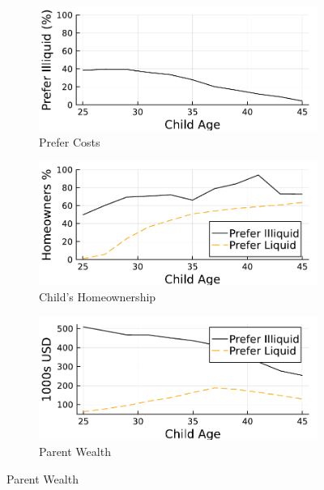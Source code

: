 \documentclass[12pt]{article}
\begin{document}
\begin{figure}[tb]
	\captionsetup[subfigure]{aboveskip=-1pt}
	\caption{Liquidity Preference over Age}\label{fig:prefliq}
	\begin{subfigure}{0.5\textwidth}%
		\caption{Prefer Costs}\label{fig:pref}%
		\includegraphics[width=\textwidth]{../tabfig/preferliq/prefer.pdf}%
	\end{subfigure}%
	\hfill
	\begin{subfigure}{0.5\textwidth}%
		\caption{Child's Homeownership}\label{fig:pref_own}%
		\includegraphics[width=\textwidth]{../tabfig/preferliq/prefer_owner.pdf}%
	\end{subfigure} 
	\begin{subfigure}{0.5\textwidth}%
		\caption{Parent Wealth}\label{fig:pref_wealthp}%
		\includegraphics[width=\textwidth]{../tabfig/preferliq/prefer_wealthp.pdf}%

\end{subfigure}
\end{figure}
\end{document}

